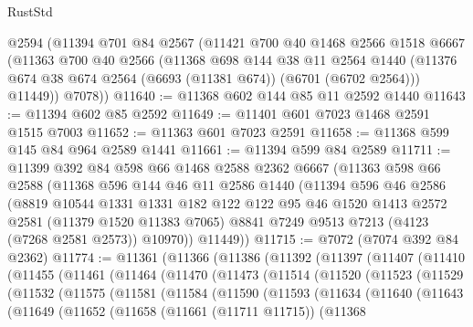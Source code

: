 \begin{lexlean}{RustStd}
\begin{coremodule}
    @2594
    (@11394
      @701
      @84
      @2567
      (@11421
        @700
        @40
        @1468
        @2566
        @1518
        @6667
        (@11363
          @700
          @40
          @2566
          (@11368
            @698
            @144
            @38
            @11
            @2564
            @1440
            (@11376 @674 @38 @674 @2564 (@6693 (@11381 @674)) (@6701 (@6702 @2564)))
            @11449))
        @7078))
@11640 := @11368 @602 @144 @85 @11 @2592 @1440
@11643 := @11394 @602 @85 @2592
@11649 := @11401 @601 @7023 @1468 @2591 @1515 @7003
@11652 := @11363 @601 @7023 @2591
@11658 := @11368 @599 @145 @84 @964 @2589 @1441
@11661 := @11394 @599 @84 @2589
@11711 := @11399
    @392
    @84
    @598
    @66
    @1468
    @2588
    @2362
    @6667
    (@11363
      @598
      @66
      @2588
      (@11368
        @596
        @144
        @46
        @11
        @2586
        @1440
        (@11394
          @596
          @46
          @2586
          (@8819
            @10544
            @1331
            @1331
            @182
            @122
            @122
            @95
            @46
            @1520
            @1413
            @2572
            @2581
            (@11379 @1520 @11383 @7065)
            @8841
            @7249
            @9513
            @7213
            (@4123 (@7268 @2581 @2573))
            @10970))
        @11449))
@11715 := @7072 (@7074 @392 @84 @2362)
@11774 := @11361
    (@11366
      (@11386
        (@11392
          (@11397
            (@11407
              (@11410
                (@11455
                  (@11461
                    (@11464
                      (@11470
                        (@11473
                          (@11514
                            (@11520
                              (@11523
                                (@11529
                                  (@11532
                                    (@11575
                                      (@11581
                                        (@11584
                                          (@11590
                                            (@11593
                                              (@11634
                                                (@11640
                                                  (@11643
                                                    (@11649
                                                      (@11652
                                                        (@11658
                                                          (@11661 (@11711 @11715))
                                                          (@11368

\end{coremodule}
\end{lexlean}
